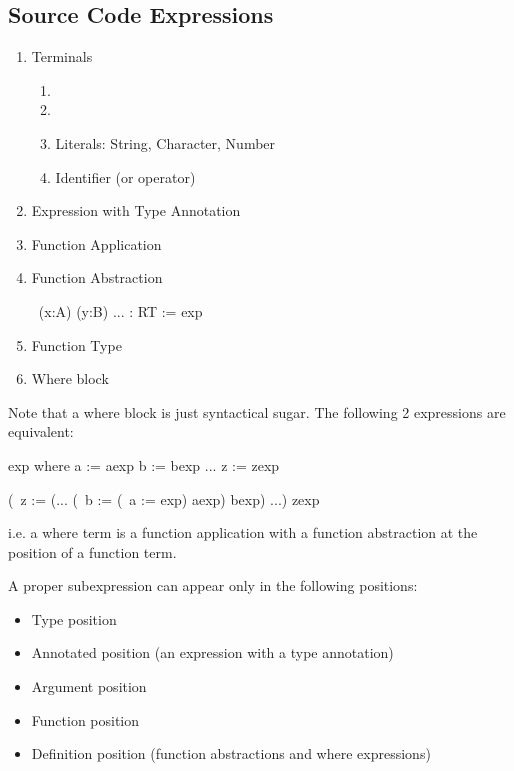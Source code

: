 \subsection {Source Code Expressions}

\begin{enumerate}

\item Terminals

    \begin{enumerate}
    \item {}
    \item {}
    \item Literals: String, Character, Number
    \item Identifier (or operator)
    \end{enumerate}

\item Expression with Type Annotation 

\item Function Application 

\item Function Abstraction
\begin{alba}
    \ (x:A) (y:B) ... : RT := exp
\end{alba}

\item Function Type 

\item Where block 

\end{enumerate}


Note that a where block is just syntactical sugar. The following 2 expressions
are equivalent:
\begin{alba}
    exp where
        a := aexp
        b := bexp
        ...
        z := zexp

    (\ z := (... (\ b := (\ a := exp) aexp) bexp) ...) zexp
\end{alba}
%
i.e. a where term is a function application with a function abstraction at the
position of a function term.

A proper subexpression can appear only in the following positions:
\begin{itemize}

\item Type position

\item Annotated position (an expression with a type annotation)

\item Argument position

\item Function position

\item Definition position (function abstractions and where expressions)
\end{itemize}

